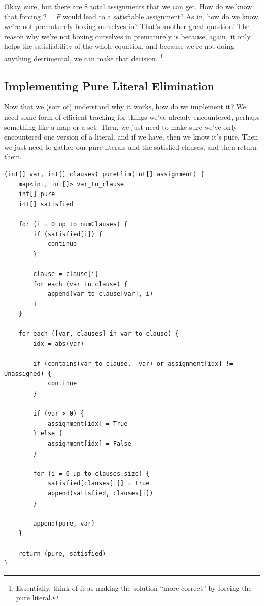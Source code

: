 \documentclass[../main.tex]{subfiles}
\begin{document}
Okay, sure, but there are 8 total assignments that we can get. How do we know that forcing 
$2 = F$ would lead to a satisfiable assignment? As in, how do we know we're not prematurely 
boxing ourselves in? That's another great question! The reason why we're not boxing ourselves 
in prematurely is because, again, it only helps the satisfiability of the whole equation, 
and because we're not doing anything detrimental, we can make that decision.
\footnote{Essentially, think of it as making the solution ``more correct'' 
by forcing the pure literal.}

\subsection{Implementing Pure Literal Elimination}

Now that we (sort of) understand why it works, how do we implement it?
We need some form of efficient tracking for things we've already encountered, perhaps 
something like a map or a set. Then, we just need to make sure we've only encountered 
one version of a literal, and if we have, then we know it's pure. Then we just need 
to gather our pure literals and the satisfied clauses, and then return them. 

\begin{lstlisting}
(int[] var, int[] clauses) pureElim(int[] assignment) {
    map<int, int[]> var_to_clause
    int[] pure
    int[] satisfied

    for (i = 0 up to numClauses) {
        if (satisfied[i]) {
            continue
        }

        clause = clause[i]
        for each (var in clause) {
            append(var_to_clause[var], i)
        }
    }
    
    for each ([var, clauses] in var_to_clause) {
        idx = abs(var)

        if (contains(var_to_clause, -var) or assignment[idx] != Unassigned) {
            continue
        }

        if (var > 0) {
            assignment[idx] = True
        } else {
            assignment[idx] = False
        }

        for (i = 0 up to clauses.size) {
            satisfied[clauses[i]] = true
            append(satisfied, clauses[i])
        }

        append(pure, var)
    }

    return (pure, satisfied)
}
\end{lstlisting}
\end{document}

